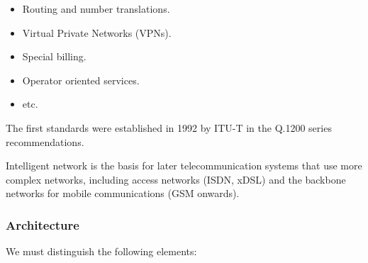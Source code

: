 \documentclass[../main.tex]{subfiles}
\begin{document}
\begin{itemize}
	\item Routing and number translations.
	\item Virtual Private Networks (VPNs).
	\item Special billing.
	\item Operator oriented services.
	\item etc.
\end{itemize}

The first standards were established in 1992 by ITU-T in the Q.1200 series recommendations.

Intelligent network is the basis for later telecommunication systems that use more complex networks, including access networks (ISDN, xDSL) and the backbone networks for mobile communications (GSM onwards).

\subsubsection{Architecture}

We must distinguish the following elements:
\end{document}
